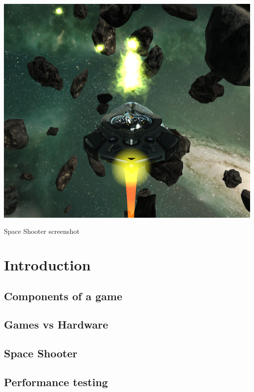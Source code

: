 \documentclass[sigconf]{acmart}
\begin{document}
\begin{teaserfigure}
  \centering
  \includegraphics[width=\linewidth]{images/teaser}
  \caption{Space Shooter screenshot}
  \label{fig:teaser}
  \vspace{0.03cm}
\end{teaserfigure}
\maketitle
\section{Introduction}
\subsection{Components of a game}
\subsection{Games vs Hardware}
\subsection{Space Shooter}

\subsection{Performance testing}

\end{document}
